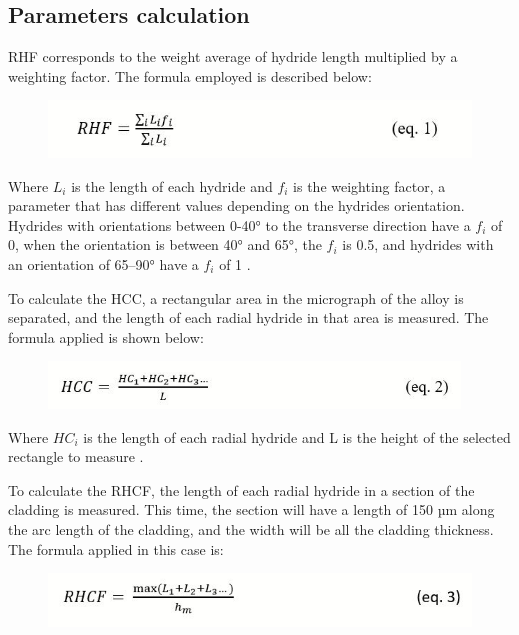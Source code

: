 
\subsection{Parameters calculation}


\noindent
RHF corresponds to the weight average of hydride length multiplied by a weighting factor. The formula employed is described below:


\begin{figure}[h] %
    \raggedleft
    \includegraphics[width=4.5in]{Figures/2-Parameters/RHF.JPG}
    \label{fig:my_label}
\end{figure}


\noindent
Where $L_i$ is the length of each hydride and $f_i$ is the weighting factor, a parameter that has different values depending on the hydrides orientation. Hydrides with orientations between 0-40° to the transverse direction have a $f_i$ of 0, when the orientation is between 40° and 65°, the $f_i$ is 0.5, and hydrides with an orientation of 65–90° have a $f_i$ of 1 \cite{COLAS2013586}. 

\noindent
To calculate the HCC, a rectangular area in the micrograph of the alloy is separated, and the length of each radial hydride in that area is measured. The formula applied is shown below:


\begin{figure}[h] %
    \raggedleft
    \includegraphics[width=4.3in]{Figures/2-Parameters/HCC.JPG}
    \label{fig:my_label}
\end{figure}
\noindent
Where $HC_i$ is the length of each radial hydride and L is the height of the selected rectangle to measure \cite{SIMON2021152817}.

\noindent
To calculate the RHCF, the length of each radial hydride in a section of the cladding is measured. This time, the section will have a length of 150 µm along the arc length of the cladding, and the width will be all the cladding thickness. The formula applied in this case is:

\begin{figure}[h] %
    \raggedleft
    \includegraphics[width=4.5in]{Figures/2-Parameters/RHCF.JPG}
    \label{fig:my_label}
\end{figure}


